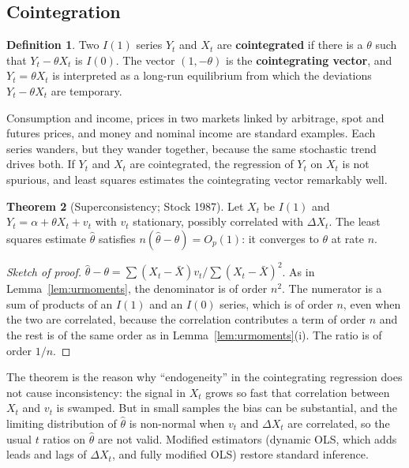 \documentclass[11pt,a4paper]{article}
\numberwithin{equation}{section}
\theoremstyle{definition}
\newtheorem{thm}{Theorem}[subsection]
\newtheorem{defn}[thm]{Definition}
\begin{document}
\subsection{Cointegration}
\label{ssec:coint}

\begin{defn}
Two $I(1)$ series $Y_t$ and $X_t$ are \textbf{cointegrated} if there is a $\theta$ such that $Y_t - \theta X_t$ is $I(0)$. The vector $(1, -\theta)$ is the \textbf{cointegrating
vector}, and $Y_t = \theta X_t$ is interpreted as a long-run equilibrium from which the deviations $Y_t - \theta X_t$ are temporary.
\end{defn}

Consumption and income, prices in two markets linked by arbitrage, spot and futures prices, and money and nominal income are standard examples.
Each series wanders, but they wander together, because the same stochastic trend drives both. If $Y_t$ and $X_t$ are cointegrated, the regression of $Y_t$ on
$X_t$ is not spurious, and least squares estimates the cointegrating vector remarkably well.

\begin{thm}[Superconsistency; Stock 1987]
\label{thm:superc}
Let $X_t$ be $I(1)$ and $Y_t = \alpha + \theta X_t + v_t$ with $v_t$ stationary, possibly correlated with $\Delta X_t$. The least squares estimate $\hat\theta$ satisfies
$n(\hat\theta - \theta) = O_p(1)$: it converges to $\theta$ at rate $n$.
\end{thm}

\begin{proof}[Sketch of proof]
$\hat\theta - \theta = \sum(X_t - \bar X)v_t/\sum(X_t - \bar X)^2$. As in Lemma~\ref{lem:urmoments}, the denominator is of order $n^2$. The numerator is a sum of products of an
$I(1)$ and an $I(0)$ series, which is of order $n$, even when the two are correlated, because the correlation contributes a term of order $n$
and the rest is of the same order as in Lemma~\ref{lem:urmoments}(i). The ratio is of order $1/n$.
\end{proof}

The theorem is the reason why ``endogeneity'' in the cointegrating regression does not cause inconsistency: the signal in $X_t$ grows so fast that
correlation between $X_t$ and $v_t$ is swamped. But in small samples the bias can be substantial, and the limiting distribution of $\hat\theta$ is non-normal
when $v_t$ and $\Delta X_t$ are correlated, so the usual $t$ ratios on $\hat\theta$ are not valid. Modified estimators (dynamic OLS, which adds leads and lags of $\Delta X_t$,
and fully modified OLS) restore standard inference.
\end{document}
